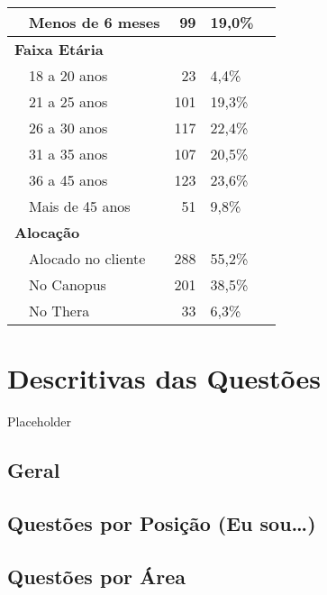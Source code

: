 \documentclass[]{book}
\begin{document}
\begin{table}[t]
\begin{tabular}{l|l|r|l|>{}p{8cm}}
\hline
\hspace{1em} & Menos de 6 meses & 99 & 19,0\%\\
\hline
\multicolumn{4}{l}{\textbf{Faixa Etária}}\\
\hline
\hspace{1em} & 18 a 20 anos & 23 & 4,4\%\\
\hline
\hspace{1em} & 21 a 25 anos & 101 & 19,3\%\\
\hline
\hspace{1em} & 26 a 30 anos & 117 & 22,4\%\\
\hline
\hspace{1em} & 31 a 35 anos & 107 & 20,5\%\\
\hline
\hspace{1em} & 36 a 45 anos & 123 & 23,6\%\\
\hline
\hspace{1em} & Mais de 45 anos & 51 & 9,8\%\\
\hline
\multicolumn{4}{l}{\textbf{Alocação}}\\
\hline
\hspace{1em} & Alocado no cliente & 288 & 55,2\%\\
\hline
\hspace{1em} & No Canopus & 201 & 38,5\%\\
\hline
\hspace{1em} & No Thera & 33 & 6,3\%\\
\hline
\end{tabular}
\end{table}

\hypertarget{descritivas-das-questoes}{%
\chapter{Descritivas das Questões}\label{descritivas-das-questoes}}

Placeholder

\hypertarget{geral}{%
\section{Geral}\label{geral}}

\hypertarget{questoes-por-posicao-eu-sou}{%
\section{Questões por Posição (Eu sou\ldots{})}\label{questoes-por-posicao-eu-sou}}

\hypertarget{questoes-por-area}{%
\section{Questões por Área}\label{questoes-por-area}}
\end{document}
